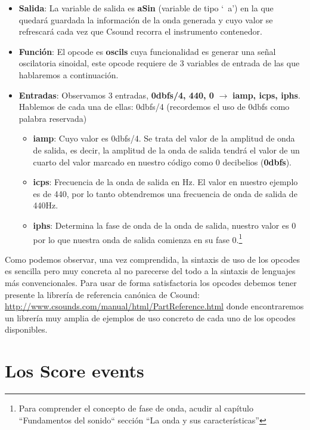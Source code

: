 \begin{itemize}
 \item \textbf{Salida}: La variable de salida es \textbf{aSin} (variable de tipo `\ a') en la que quedará guardada la información de la onda generada y cuyo valor se refrescará cada vez que Csound recorra el instrumento contenedor.
 
 \item \textbf{Función}: El opcode es \textbf{oscils} cuya funcionalidad es generar una señal oscilatoria sinoidal, este opcode requiere de 3 variables de entrada de las que hablaremos a continuación.
 
 \item \textbf{Entradas}: Observamos 3 entradas, \textbf{0dbfs/4, 440, 0} $\rightarrow$ \textbf{iamp, icps, iphs}. Hablemos  de cada una de ellas: 0dbfs/4 (recordemos el uso de 0dbfs como palabra reservada) 
 \begin{itemize}
 \item \textbf{iamp}: Cuyo valor es 0dbfs/4. Se trata del valor de la amplitud de onda de salida, es decir, la amplitud de la onda de salida tendrá el valor de un cuarto del valor marcado en nuestro código como 0 decibelios (\textbf{0dbfs}).
 
 \item \textbf{icps}: Frecuencia de la onda de salida en Hz. El valor en nuestro ejemplo es de 440, por lo tanto obtendremos una frecuencia de onda de salida de 440Hz.
 
 \item \textbf{iphs}: Determina la fase de onda de la onda de salida, nuestro valor es 0 por lo que nuestra onda de salida comienza en su fase 0.\footnote{Para comprender el concepto de fase de onda, acudir al capítulo ``Fundamentos del sonido`` sección ``La onda y sus características''}

 \end{itemize}

\end{itemize}

Como podemos observar, una vez comprendida, la sintaxis de uso de los opcodes es sencilla pero muy concreta al no parecerse del todo a la sintaxis de lenguajes más convencionales. Para usar de forma satisfactoria los opcodes debemos tener presente la librería de referencia canónica de Csound: \url{http://www.csounds.com/manual/html/PartReference.html} donde encontraremos un librería muy amplia de ejemplos de uso concreto de cada uno de los opcodes disponibles.

\section{Los Score events}\label{sec:scores}

